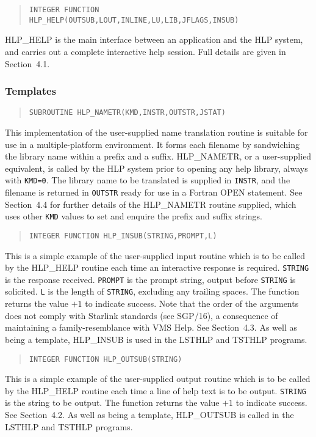 \begin{verse}
{\tt INTEGER FUNCTION HLP\_HELP(OUTSUB,LOUT,INLINE,LU,LIB,JFLAGS,INSUB)}
\end{verse}
HLP\_HELP is the main interface between an application and the
HLP system, and carries out a complete interactive help session.
Full details are given in Section~4.1.

\subsubsection{Templates}
\begin{verse}
{\tt SUBROUTINE HLP\_NAMETR(KMD,INSTR,OUTSTR,JSTAT)}
\end{verse}
This implementation of the user-supplied name translation routine is
suitable for use in a multiple-platform environment.  It forms each
filename by sandwiching the library name within a prefix and a suffix.
HLP\_NAMETR, or a user-supplied equivalent, is called by the
HLP system prior to opening any help library, always
with {\tt KMD=0}.  The
library name to be translated is supplied in {\tt INSTR}, and
the filename is returned in {\tt OUTSTR} ready for use in a
Fortran OPEN statement.
See Section~4.4 for further details of the HLP\_NAMETR routine
supplied, which uses other {\tt KMD} values to set and enquire the
prefix and suffix strings.

\begin{verse}
{\tt INTEGER FUNCTION HLP\_INSUB(STRING,PROMPT,L)}
\end{verse}
This is a simple example of the user-supplied input
routine which is to be called by the HLP\_HELP routine each
time an interactive response is required.  {\tt STRING} is the response
received. {\tt PROMPT} is the prompt string,
output before {\tt STRING} is solicited.  {\tt L} is the length
of {\tt STRING}, excluding any trailing spaces.  The function
returns the value $+1$ to indicate success.  Note that the order of
the arguments does not comply with Starlink standards (see SGP/16),
a consequence of maintaining a family-resemblance with VMS Help.  See
Section~4.3.  As well as being a template, HLP\_INSUB is used in
the LSTHLP and TSTHLP programs.

\begin{verse}
{\tt INTEGER FUNCTION HLP\_OUTSUB(STRING)}
\end{verse}
This is a simple example of the user-supplied output routine which is
to be called by the HLP\_HELP routine each time a line of help text
is to be output.
{\tt STRING} is the string to be output.  The function
returns the value $+1$ to indicate success.  See Section~4.2.
As well as being a template, HLP\_OUTSUB is called in
the LSTHLP and TSTHLP programs.

